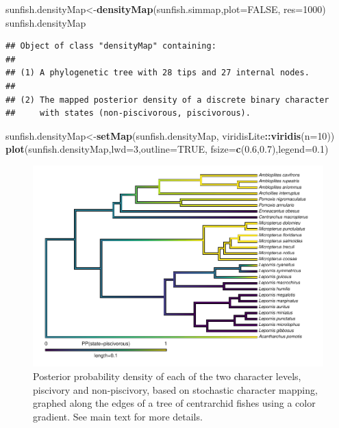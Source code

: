 \documentclass[fleqn,10pt,lineno]{wlpeerj} %
\newenvironment{Shaded}{\begin{snugshade}}{\end{snugshade}}
\newcommand{\AttributeTok}[1]{\textcolor[rgb]{0.13,0.29,0.53}{#1}}
\newcommand{\ConstantTok}[1]{\textcolor[rgb]{0.56,0.35,0.01}{#1}}
\newcommand{\DecValTok}[1]{\textcolor[rgb]{0.00,0.00,0.81}{#1}}
\newcommand{\FloatTok}[1]{\textcolor[rgb]{0.00,0.00,0.81}{#1}}
\newcommand{\FunctionTok}[1]{\textcolor[rgb]{0.13,0.29,0.53}{\textbf{#1}}}
\newcommand{\NormalTok}[1]{#1}
\newcommand{\OtherTok}[1]{\textcolor[rgb]{0.56,0.35,0.01}{#1}}
\newcommand{\SpecialCharTok}[1]{\textcolor[rgb]{0.81,0.36,0.00}{\textbf{#1}}}
\begin{document}
\begin{Shaded}
\begin{Highlighting}[]
\NormalTok{sunfish.densityMap}\OtherTok{\textless{}{-}}\FunctionTok{densityMap}\NormalTok{(sunfish.simmap,}\AttributeTok{plot=}\ConstantTok{FALSE}\NormalTok{,}
  \AttributeTok{res=}\DecValTok{1000}\NormalTok{)}
\NormalTok{sunfish.densityMap}
\end{Highlighting}
\end{Shaded}

\begin{verbatim}
## Object of class "densityMap" containing:
## 
## (1) A phylogenetic tree with 28 tips and 27 internal nodes.
## 
## (2) The mapped posterior density of a discrete binary character
##     with states (non-piscivorous, piscivorous).
\end{verbatim}

\begin{Shaded}
\begin{Highlighting}[]
\NormalTok{sunfish.densityMap}\OtherTok{\textless{}{-}}\FunctionTok{setMap}\NormalTok{(sunfish.densityMap,}
\NormalTok{  viridisLite}\SpecialCharTok{::}\FunctionTok{viridis}\NormalTok{(}\AttributeTok{n=}\DecValTok{10}\NormalTok{))}
\FunctionTok{plot}\NormalTok{(sunfish.densityMap,}\AttributeTok{lwd=}\DecValTok{3}\NormalTok{,}\AttributeTok{outline=}\ConstantTok{TRUE}\NormalTok{,}
  \AttributeTok{fsize=}\FunctionTok{c}\NormalTok{(}\FloatTok{0.6}\NormalTok{,}\FloatTok{0.7}\NormalTok{),}\AttributeTok{legend=}\FloatTok{0.1}\NormalTok{)}
\end{Highlighting}
\end{Shaded}

\begin{figure}
\includegraphics[width=1\linewidth]{Revell.phytools-v2_peerj_files/figure-latex/fig04-densityMap-1} \caption{Posterior probability density of each of the two character levels, piscivory and non-piscivory, based on stochastic character mapping, graphed along the edges of a tree of centrarchid fishes using a color gradient. See main text for more details.}\label{fig:fig04-densityMap}
\end{figure}
\end{document}

